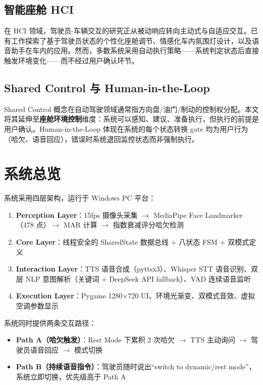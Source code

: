 \documentclass[12pt,a4paper]{ctexart}
\begin{document}
\subsection{智能座舱 HCI}

在 HCI 领域，驾驶员-车辆交互的研究正从被动响应转向主动式与自适应交互。已有工作探索了基于驾驶员状态的个性化座舱调节、情感化车内氛围灯设计，以及语音助手在车内的应用。然而，多数系统采用自动执行策略——系统判定状态后直接触发环境变化——而不经过用户确认环节。

\subsection{Shared Control 与 Human-in-the-Loop}

Shared Control 概念在自动驾驶领域通常指方向盘/油门/制动的控制权分配。本文将其延伸至\textbf{座舱环境控制}维度：系统可以感知、建议、准备执行，但执行的前提是用户确认。Human-in-the-Loop 体现在系统的每个状态转换 gate 均为用户行为（哈欠、语音回应），错误时系统退回监控状态而非强制执行。

\section{系统总览}

系统采用四层架构，运行于 Windows PC 平台：

\begin{enumerate}[label=\arabic*.]
    \item \textbf{Perception Layer}：15fps 摄像头采集 $\rightarrow$ MediaPipe Face Landmarker（478 点）$\rightarrow$ MAR 计算 $\rightarrow$ 指数衰减评分哈欠检测
    \item \textbf{Core Layer}：线程安全的 SharedState 数据总线 + 八状态 FSM + 双模式定义
    \item \textbf{Interaction Layer}：TTS 语音合成（pyttsx3）、Whisper STT 语音识别、双层 NLP 意图解析（关键词 + DeepSeek API fallback）、VAD 连续语音监听
    \item \textbf{Execution Layer}：Pygame 1280$\times$720 UI、环境光渐变、双模式音效、虚拟空调参数显示
\end{enumerate}

系统同时提供两条交互路径：
\begin{itemize}
    \item \textbf{Path A（哈欠触发）}：Rest Mode 下累积 2 次哈欠 $\rightarrow$ TTS 主动询问 $\rightarrow$ 驾驶员语音回应 $\rightarrow$ 模式切换
    \item \textbf{Path B（持续语音指令）}：驾驶员随时说出“switch to dynamic/rest mode”，系统立即切换，优先级高于 Path A
\end{itemize}
\end{document}
